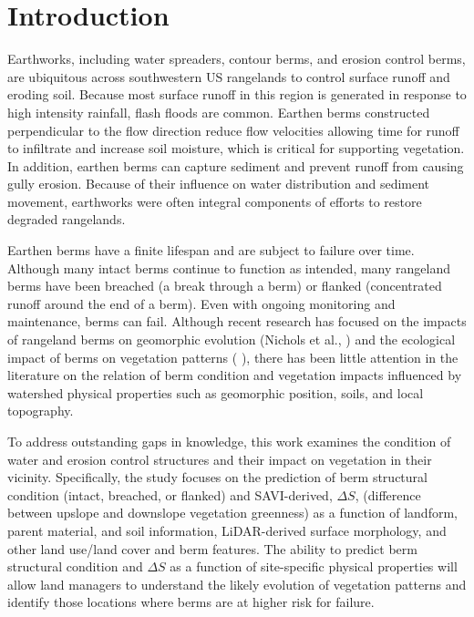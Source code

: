 \documentclass[review]{elsarticle}
\begin{document}
\section{Introduction}
Earthworks, including water spreaders, contour berms, and erosion control berms, are ubiquitous across southwestern US rangelands to control surface runoff and eroding soil. Because most surface runoff in this region is generated in response to high intensity rainfall, flash floods are common. Earthen berms constructed perpendicular to the flow direction reduce flow velocities allowing time for runoff to infiltrate and increase soil moisture, which is critical for supporting vegetation. In addition, earthen berms can capture sediment and prevent runoff from causing gully erosion. Because of their influence on water distribution and sediment movement, earthworks were often integral components of efforts to restore degraded rangelands.

Earthen berms have a finite lifespan and are subject to failure over time. Although many intact berms continue to function as intended, many rangeland berms have been breached (a break through a berm) or flanked (concentrated runoff around the end of a berm). Even with ongoing monitoring and maintenance, berms can fail. Although recent research has focused on the impacts of rangeland berms on geomorphic evolution (Nichols et al.,     ) and the ecological impact of berms on vegetation patterns (         ), there has been little attention in the literature on the relation of berm condition and vegetation impacts influenced by watershed physical properties such as geomorphic position, soils, and local topography.

To address outstanding gaps in knowledge, this work examines the condition of water and erosion control structures and their impact on vegetation in their vicinity. Specifically, the study focuses on the prediction of berm structural condition (intact, breached, or flanked) and SAVI-derived, $\Delta S$, (difference between upslope and downslope vegetation greenness) as a function of landform, parent material, and soil information, LiDAR-derived surface morphology, and other land use/land cover and berm features. The ability to predict berm structural condition and $\Delta S$ as a function of site-specific physical properties will allow land managers to understand the likely evolution of vegetation patterns and identify those locations where berms are at higher risk for failure. 

\end{document}
